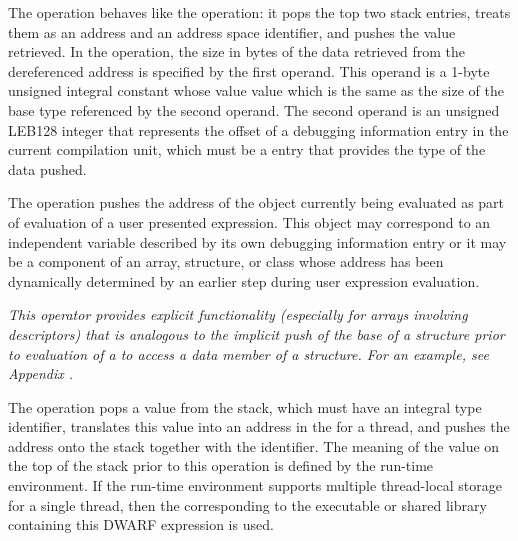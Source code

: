 \begin{enumerate}[1. ]
\itembfnl{\DWOPxdereftypeTARG}
The \DWOPxdereftypeNAME{} operation behaves like the \DWOPxderefsize{}
operation: it pops the top two stack entries, treats them as an address and
an address space identifier, and pushes the value retrieved. In the
\DWOPxdereftypeNAME{} operation, the size in bytes of the data retrieved from
the dereferenced address is specified by the first operand. This operand is
a 1-byte unsigned integral constant whose value 
value which is the same as the size of the base type referenced
by the second operand. The second
operand is an unsigned LEB128 integer that represents the offset of a
debugging information entry in the current compilation unit, which must be a
\DWTAGbasetype{} entry that provides the type of the data pushed.

\itembfnl{\DWOPpushobjectaddressTARG}
The \DWOPpushobjectaddressNAME{}
operation pushes the address
of the object currently being evaluated as part of evaluation
of a user presented expression. This object may correspond
to an independent variable described by its own debugging
information entry or it may be a component of an array,
structure, or class whose address has been dynamically
determined by an earlier step during user expression
evaluation.

\textit{This operator provides explicit functionality
(especially for arrays involving descriptors) that is analogous
to the implicit push of the base 
of a structure prior to evaluation of a 
\DWATdatamemberlocation{} 
to access a data member of a structure. For an example, see 
Appendix .}

\itembfnl{\DWOPformtlsaddressTARG}
The \DWOPformtlsaddressNAME{} 
operation pops a value from the stack, which must have an 
integral type identifier, translates this
value into an address in the 
for a thread, and pushes the address 
onto the stack together with the \specialaddresstype{} identifier. 
The meaning of the value on the top of the stack prior to this 
operation is defined by the run-time environment.  If the run-time 
environment supports multiple thread-local storage 
 for a single thread, then the  
corresponding to the executable or shared 
library containing this DWARF expression is used.
   

\end{enumerate}
